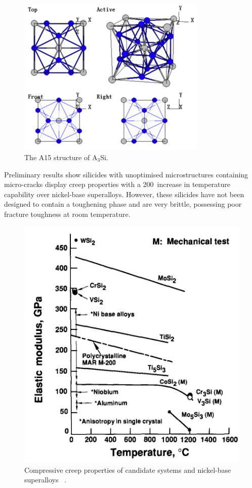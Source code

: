 %
\begin{figure}[H]
\begin{center}
\includegraphics[width=9cm]{A15}
\caption{The A15 structure of A$_3$Si.}
\label{fig:A15}
\end{center}
\end{figure}
Preliminary results show silicides with unoptimised microstructures containing micro-cracks display creep properties with a 200\celsius\ increase in temperature capability over nickel-base superalloys. However, these silicides have not been designed to contain a toughening phase and are very brittle, possessing poor fracture toughness at room temperature. 
%
\begin{figure}[H]
\begin{center}
\includegraphics[width=.6\textwidth]{creepshah92_1}
\vspace{-.3cm}
\caption{Compressive creep properties of candidate systems and nickel-base superalloys ~\cite{shah92}.}\label{fig:creepshah92_1}
\end{center}
\end{figure}
